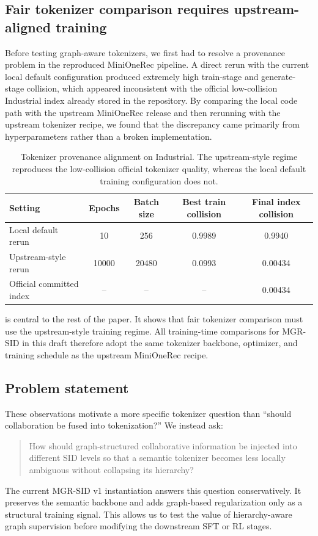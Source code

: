 \subsection{Fair tokenizer comparison requires upstream-aligned training}

Before testing graph-aware tokenizers, we first had to resolve a provenance problem in the reproduced MiniOneRec pipeline. A direct rerun with the current local default configuration produced extremely high train-stage and generate-stage collision, which appeared inconsistent with the official low-collision Industrial index already stored in the repository. By comparing the local code path with the upstream MiniOneRec release and then rerunning with the upstream tokenizer recipe, we found that the discrepancy came primarily from hyperparameters rather than a broken implementation.

\begin{table}[t]
  \centering
  \caption{Tokenizer provenance alignment on Industrial. The upstream-style \rqvae{} regime reproduces the low-collision official tokenizer quality, whereas the local default training configuration does not.}
  \label{tab:provenance}
  \begin{tabular}{lcccc}
    \toprule
    Setting & Epochs & Batch size & Best train collision & Final index collision \\
    \midrule
    Local default rerun & 10 & 256 & 0.9989 & 0.9940 \\
    Upstream-style rerun & 10000 & 20480 & 0.0993 & 0.00434 \\
    Official committed index & -- & -- & -- & 0.00434 \\
    \bottomrule
  \end{tabular}
\end{table}

 is central to the rest of the paper. It shows that fair tokenizer comparison must use the upstream-style \rqvae{} training regime. All training-time comparisons for MGR-SID in this draft therefore adopt the same tokenizer backbone, optimizer, and training schedule as the upstream MiniOneRec recipe.

\subsection{Problem statement}

These observations motivate a more specific tokenizer question than ``should collaboration be fused into tokenization?'' We instead ask:
\begin{quote}
How should graph-structured collaborative information be injected into different SID levels so that a semantic tokenizer becomes less locally ambiguous without collapsing its hierarchy?
\end{quote}

The current MGR-SID v1 instantiation answers this question conservatively. It preserves the semantic \rqvae{} backbone and adds graph-based regularization only as a structural training signal. This allows us to test the value of hierarchy-aware graph supervision before modifying the downstream SFT or RL stages.
